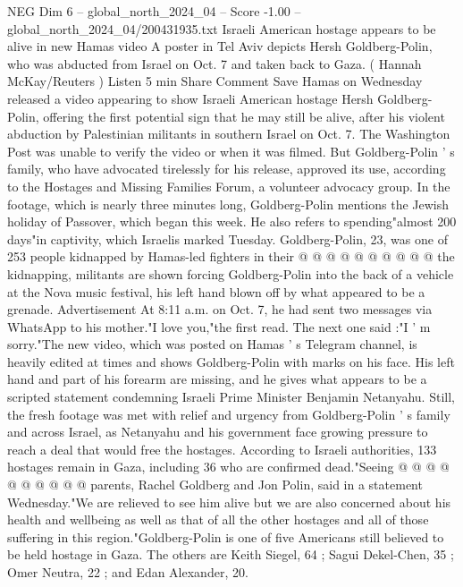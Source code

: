 \begin{textsample}{NEG Dim 6 – global\_north\_2024\_04 – Score -1.00 – global\_north\_2024\_04/200431935.txt}  \label{ex:f6_neg_342}
Israeli American hostage appears to be alive in new Hamas video A poster in Tel Aviv depicts Hersh Goldberg-Polin, who was abducted from Israel on Oct. 7 and taken back to Gaza. ( Hannah McKay/Reuters ) Listen 5 min Share Comment Save Hamas on Wednesday released a video appearing to show Israeli American hostage Hersh Goldberg-Polin, offering the first potential sign that he may still be alive, after his violent abduction by Palestinian militants in southern Israel on Oct. 7.
The Washington Post was unable to verify the video or when it was filmed.
But Goldberg-Polin ' s family, who have advocated tirelessly for his release, approved its use, according to the Hostages and Missing Families Forum, a volunteer advocacy group.
In the footage, which is nearly three minutes long, Goldberg-Polin mentions the Jewish holiday of Passover, which began this week.
He also refers to spending"almost 200 days"in captivity, which Israelis marked Tuesday.
Goldberg-Polin, 23, was one of 253 people kidnapped by Hamas-led fighters in their @ @ @ @ @ @ @ @ @ @ the kidnapping, militants are shown forcing Goldberg-Polin into the back of a vehicle at the Nova music festival, his left hand blown off by what appeared to be a grenade.
Advertisement At 8:11 a.m. on Oct. 7, he had sent two messages via WhatsApp to his mother."I love you,"the first read.
The next one said :"I ' m sorry."The new video, which was posted on Hamas ' s Telegram channel, is heavily edited at times and shows Goldberg-Polin with marks on his face.
His left hand and part of his forearm are missing, and he gives what appears to be a scripted statement condemning Israeli Prime Minister Benjamin Netanyahu.
Still, the fresh footage was met with relief and urgency from Goldberg-Polin ' s family and across Israel, as Netanyahu and his government face growing pressure to reach a deal that would free the hostages.
According to Israeli authorities, 133 hostages remain in Gaza, including 36 who are confirmed dead."Seeing @ @ @ @ @ @ @ @ @ @ parents, Rachel Goldberg and Jon Polin, said in a statement Wednesday."We are relieved to see him alive but we are also concerned about his health and wellbeing as well as that of all the other hostages and all of those suffering in this region."Goldberg-Polin is one of five Americans still believed to be held hostage in Gaza.
The others are Keith Siegel, 64 ; Sagui Dekel-Chen, 35 ; Omer Neutra, 22 ; and Edan Alexander, 20.

\end{textsample}
